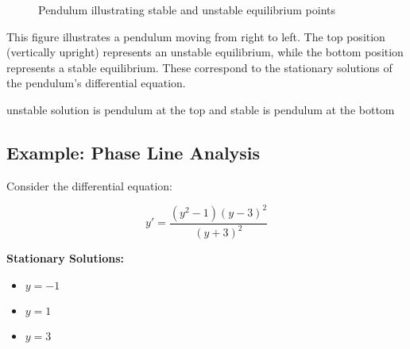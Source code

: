 \documentclass{article}
\begin{document}
\begin{figure}[h]
    \centering
    \caption{Pendulum illustrating stable and unstable equilibrium points}
    \label{fig:pendulum}
\end{figure}

This figure illustrates a pendulum moving from right to left. The top position (vertically upright) represents an unstable equilibrium, while the bottom position represents a stable equilibrium. These correspond to the stationary solutions of the pendulum's differential equation.


unstable solution is pendulum at the top and stable is pendulum at the bottom





\subsection*{Example: Phase Line Analysis}

Consider the differential equation:

\[
y' = \frac{(y^2-1)(y-3)^2}{(y+3)^2}
\]

\textbf{Stationary Solutions:}
\begin{itemize}
    \item $y = -1$
    \item $y = 1$
    \item $y = 3$
\end{itemize}
\end{document}

